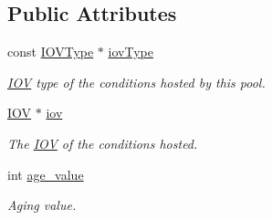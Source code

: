 \subsection*{Public Attributes}
\begin{DoxyCompactItemize}
\item 
const \hyperlink{class_d_d4hep_1_1_i_o_v_type}{IOVType} $\ast$ \hyperlink{class_d_d4hep_1_1_conditions_1_1_conditions_pool_a517c78c83270296921430bbd85ab1782}{iovType}
\begin{DoxyCompactList}\small\item\em \hyperlink{class_d_d4hep_1_1_i_o_v}{IOV} type of the conditions hosted by this pool. \item\end{DoxyCompactList}\item 
\hyperlink{class_d_d4hep_1_1_i_o_v}{IOV} $\ast$ \hyperlink{class_d_d4hep_1_1_conditions_1_1_conditions_pool_a5c86deb9085a420b2d8355ca835f3fc9}{iov}
\begin{DoxyCompactList}\small\item\em The \hyperlink{class_d_d4hep_1_1_i_o_v}{IOV} of the conditions hosted. \item\end{DoxyCompactList}\item 
int \hyperlink{class_d_d4hep_1_1_conditions_1_1_conditions_pool_af75e42540703ef23e16c26a5655f2319}{age\_\-value}
\begin{DoxyCompactList}\small\item\em Aging value. \item\end{DoxyCompactList}\end{DoxyCompactItemize}
